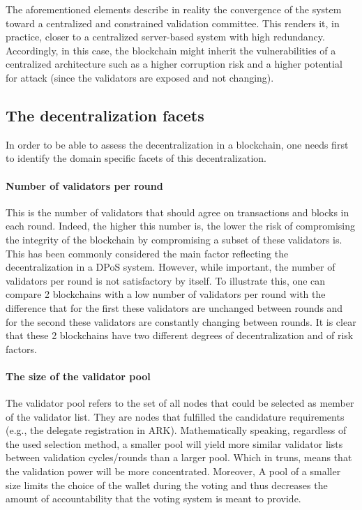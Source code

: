 \documentclass{article}
\begin{document}
The aforementioned elements describe in reality the convergence of the system toward a centralized and constrained validation committee. This renders it, in practice, closer to a centralized server-based system with high redundancy. Accordingly, in this case, the blockchain might inherit the vulnerabilities of a centralized architecture such as a higher corruption risk and a higher potential for attack (since the validators are exposed and not changing).

\subsection{The decentralization facets}
In order to be able to assess the decentralization in a blockchain, one needs first to identify the domain specific facets of this decentralization.

\paragraph{Number of validators per round}
This is the number of validators that should agree on transactions and blocks in each round. Indeed, the higher this number is, the lower the risk of compromising the integrity of the blockchain by compromising a subset of these validators is. This has been commonly considered the main factor reflecting the decentralization in a DPoS system.  However, while important, the number of validators per round is not satisfactory by itself. To illustrate this, one can compare 2 blockchains with a low number of validators per round with the difference that for the first these validators are unchanged between rounds and for the second these validators are constantly changing between rounds. It is clear that these 2 blockchains have two different degrees of decentralization and of risk factors.

\paragraph{The size of the validator pool}
The validator pool refers to the set of all nodes that could be selected as member of the validator list. They are nodes that fulfilled the candidature requirements (e.g., the delegate registration in ARK). Mathematically speaking, regardless of the used selection method, a smaller pool will yield more similar validator lists between validation cycles/rounds than a larger pool. Which in truns, means that the validation power will be more concentrated. Moreover, A pool of a smaller size limits the choice of the wallet during the voting and thus decreases the amount of accountability that the voting system is meant to provide.
\end{document}
